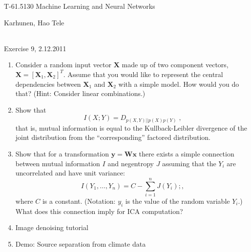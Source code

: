 \documentclass[10pt]{article}
\begin{document}
\pagestyle{empty}
\begin{Large}
\begin{bf} 
T-61.5130 Machine Learning and Neural Networks\\ 
\end{bf}
\end{Large}
Karhunen, Hao Tele\\  
\\
\begin{large}
\begin{bf}
Exercise 9,  2.12.2011
\end{bf}
\end{large}
\begin{enumerate}

\item Consider a random input vector $\mathbf{X}$ made up of two component vectors,
 $\mathbf{X} = [\mathbf{X}_1,\mathbf{X}_2]^T$. Assume that you would like to represent the
 central dependencies between $\mathbf{X}_1$ and $\mathbf{X}_2$ with a  simple
 model. How would you do that? (Hint: Consider linear combinations.)

\vspace{2mm}

\item Show that
\begin{displaymath}
  I(X;Y) = D_{p(X,Y)||p(X)p(Y)} \; ,
\end{displaymath}
that is, mutual information is equal to the Kullback-Leibler
divergence of the joint distribution from the ``corresponding''
factored distribution.

\vspace{2mm}

\item Show that for a transformation $\mathbf{y} = \mathbf{W}
  \mathbf{x}$ there exists a simple connection between mutual information $I$
  and negentropy $J$ assuming that the $Y_i$ are uncorrelated and have
  unit variance:
  \[
  I(Y_1, \ldots , Y_n) = C - \sum_{i=1}^n J(Y_i) ; ,
  \]
  where $C$ is a constant. (Notation: $y_i$ is the value of the random
  variable $Y_i$.) What does this connection imply for ICA computation?

\item Image denoising tutorial

\item Demo: Source separation from climate data

\end{enumerate}
\end{document}
